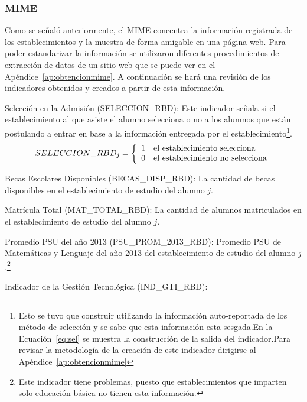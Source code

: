 \subsubsection{MIME}
Como se señaló anteriormente, el MIME concentra la información registrada de los establecimientos y la muestra de forma amigable en una página web. Para poder estandarizar la información se utilizaron diferentes procedimientos de extracción de datos de un sitio web que se puede ver en el Apéndice~\ref{ap:obtencionmime}.
A continuación se hará una revisión de los indicadores obtenidos y creados a partir de esta información.
\begin{longdescription}
     \item[Selección en la Admisión](SELECCION\_RBD): Este indicador señala si el establecimiento al que asiste el alumno selecciona o no a los alumnos que están postulando a entrar en base a la información entregada por el establecimiento\footnote{Esto se tuvo que construir utilizando la información auto-reportada de los método de selección y se sabe que esta información esta sesgada.En la Ecuación~\ref{eq:sel} se muestra la construcción de la salida del indicador.Para revisar la metodología de la creación de este indicador dirigirse al Apéndice~\ref{ap:obtencionmime}}.
              \begin{equation}
              \centering
              SELECCION\_RBD_{j} = \left\{
                \begin{array}{c l}
                 1 & \mbox{el establecimiento selecciona}\\
                 0 & \mbox{el establecimiento no selecciona}
                \end{array}
                \right.
                \label{eq:sel}
              \end{equation}
     \item[Becas Escolares Disponibles](BECAS\_DISP\_RBD): La cantidad de becas disponibles en el establecimiento de estudio del alumno $j$.
     \item[Matrícula Total](MAT\_TOTAL\_RBD): La cantidad de alumnos matriculados en el establecimiento de estudio del alumno $j$.
     \item[Promedio PSU del año 2013](PSU\_PROM\_2013\_RBD):
     Promedio PSU de Matemáticas y Lenguaje del año 2013 del establecimiento de estudio del alumno $j$.\footnote{Este indicador tiene problemas, puesto que establecimientos que imparten solo educación básica no tienen esta información.}
     \item[Indicador de la Gestión Tecnológica](IND\_GTI\_RBD):

\end{longdescription}
